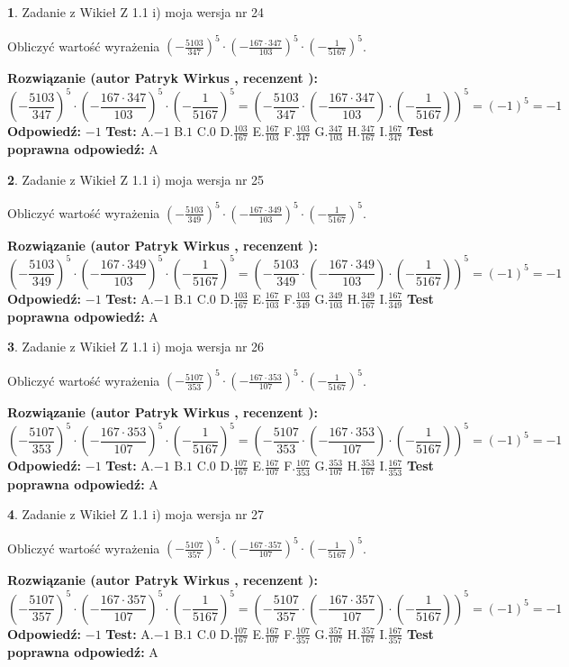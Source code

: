\documentclass[12pt, a4paper]{article}
\theoremstyle{definition} %
\newtheorem{zad}{}
\newcommand{\zadStart}[1]{\begin{zad}#1\newline}
\newcommand{\zadStop}{\end{zad}}
\newcommand{\rozwStart}[2]{\noindent \textbf{Rozwiązanie (autor #1 , recenzent #2): }\newline}
\newcommand{\rozwStop}{\newline}
\newcommand{\odpStart}{\noindent \textbf{Odpowiedź:}\newline}
\newcommand{\odpStop}{\newline}
\newcommand{\testStart}{\noindent \textbf{Test:}\newline}
\newcommand{\testStop}{\newline}
\newcommand{\kluczStart}{\noindent \textbf{Test poprawna odpowiedź:}\newline}
\newcommand{\kluczStop}{\newline}
\begin{document}
\zadStart{Zadanie z Wikieł Z 1.1 i) moja wersja nr 24}

Obliczyć wartość wyrażenia $(-\frac{5103}{347})^{5} \cdot (-\frac{167 \cdot 347}{103})^{5} \cdot (-\frac{1}{5167})^{5}$.
\zadStop
\rozwStart{Patryk Wirkus}{}
$$(-\frac{5103}{347})^{5} \cdot (-\frac{167 \cdot 347}{103})^{5} \cdot (-\frac{1}{5167})^{5} = (-\frac{5103}{347} \cdot (-\frac{167 \cdot 347}{103}) \cdot (-\frac{1}{5167}))^{5} = (-1)^{5} = -1$$
\rozwStop
\odpStart
$-1$
\odpStop
\testStart
A.$-1$ B.$1$ C.$0$ D.$\frac{103}{167}$ E.$\frac{167}{103}$
F.$\frac{103}{347}$ G.$\frac{347}{103}$
H.$\frac{347}{167}$
I.$\frac{167}{347}$
\testStop
\kluczStart
A
\kluczStop



\zadStart{Zadanie z Wikieł Z 1.1 i) moja wersja nr 25}

Obliczyć wartość wyrażenia $(-\frac{5103}{349})^{5} \cdot (-\frac{167 \cdot 349}{103})^{5} \cdot (-\frac{1}{5167})^{5}$.
\zadStop
\rozwStart{Patryk Wirkus}{}
$$(-\frac{5103}{349})^{5} \cdot (-\frac{167 \cdot 349}{103})^{5} \cdot (-\frac{1}{5167})^{5} = (-\frac{5103}{349} \cdot (-\frac{167 \cdot 349}{103}) \cdot (-\frac{1}{5167}))^{5} = (-1)^{5} = -1$$
\rozwStop
\odpStart
$-1$
\odpStop
\testStart
A.$-1$ B.$1$ C.$0$ D.$\frac{103}{167}$ E.$\frac{167}{103}$
F.$\frac{103}{349}$ G.$\frac{349}{103}$
H.$\frac{349}{167}$
I.$\frac{167}{349}$
\testStop
\kluczStart
A
\kluczStop



\zadStart{Zadanie z Wikieł Z 1.1 i) moja wersja nr 26}

Obliczyć wartość wyrażenia $(-\frac{5107}{353})^{5} \cdot (-\frac{167 \cdot 353}{107})^{5} \cdot (-\frac{1}{5167})^{5}$.
\zadStop
\rozwStart{Patryk Wirkus}{}
$$(-\frac{5107}{353})^{5} \cdot (-\frac{167 \cdot 353}{107})^{5} \cdot (-\frac{1}{5167})^{5} = (-\frac{5107}{353} \cdot (-\frac{167 \cdot 353}{107}) \cdot (-\frac{1}{5167}))^{5} = (-1)^{5} = -1$$
\rozwStop
\odpStart
$-1$
\odpStop
\testStart
A.$-1$ B.$1$ C.$0$ D.$\frac{107}{167}$ E.$\frac{167}{107}$
F.$\frac{107}{353}$ G.$\frac{353}{107}$
H.$\frac{353}{167}$
I.$\frac{167}{353}$
\testStop
\kluczStart
A
\kluczStop



\zadStart{Zadanie z Wikieł Z 1.1 i) moja wersja nr 27}

Obliczyć wartość wyrażenia $(-\frac{5107}{357})^{5} \cdot (-\frac{167 \cdot 357}{107})^{5} \cdot (-\frac{1}{5167})^{5}$.
\zadStop
\rozwStart{Patryk Wirkus}{}
$$(-\frac{5107}{357})^{5} \cdot (-\frac{167 \cdot 357}{107})^{5} \cdot (-\frac{1}{5167})^{5} = (-\frac{5107}{357} \cdot (-\frac{167 \cdot 357}{107}) \cdot (-\frac{1}{5167}))^{5} = (-1)^{5} = -1$$
\rozwStop
\odpStart
$-1$
\odpStop
\testStart
A.$-1$ B.$1$ C.$0$ D.$\frac{107}{167}$ E.$\frac{167}{107}$
F.$\frac{107}{357}$ G.$\frac{357}{107}$
H.$\frac{357}{167}$
I.$\frac{167}{357}$
\testStop
\kluczStart
A
\kluczStop
\end{document}
